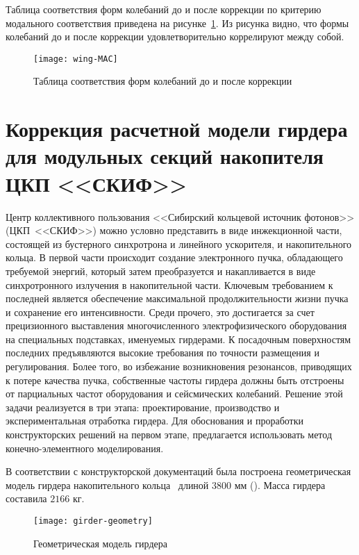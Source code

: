 Таблица соответствия форм колебаний до и после коррекции по критерию модального соответствия приведена на рисунке~\ref{fig:wing-MAC}. Из рисунка видно, что формы колебаний до и после коррекции удовлетворительно коррелируют между собой.

\begin{figure}[H]
	\centerfloat
	\texttt{[image: wing-MAC]}
	\caption{Таблица соответствия форм колебаний до и после коррекции} \label{fig:wing-MAC}
\end{figure}

\section{Коррекция расчетной модели гирдера для модульных секций накопителя ЦКП <<СКИФ>>}

Центр коллективного пользования <<Сибирский кольцевой источник фотонов>> (ЦКП~<<СКИФ>>) можно условно представить в виде инжекционной части, состоящей из бустерного синхротрона и линейного ускорителя, и накопительного кольца. В первой части происходит создание электронного пучка, обладающего требуемой энергий, который затем преобразуется и накапливается в виде синхротронного излучения в накопительной части. Ключевым требованием к последней является обеспечение максимальной продолжительности жизни пучка и сохранение его интенсивности. Среди прочего, это достигается за счет прецизионного выставления многочисленного электрофизического оборудования на специальных подставках, именуемых гирдерами. К посадочным поверхностям последних предъявляются высокие требования по точности размещения и регулирования. Более того, во избежание возникновения резонансов, приводящих к потере качества пучка, собственные частоты гирдера должны быть отстроены от парциальных частот оборудования и сейсмических колебаний. Решение этой задачи реализуется в три этапа: проектирование, производство и экспериментальная отработка гирдера. Для обоснования и проработки конструкторских решений на первом этапе, предлагается использовать метод конечно-элементного моделирования.

В соответствии с конструкторской документаций была построена геометрическая модель гирдера накопительного кольца~ длиной $ 3800 $ мм (). Масса гирдера составила $ 2166 $ кг. 

\begin{figure}[H]
	\centering
	\texttt{[image: girder-geometry]}
	\caption{Геометрическая модель гирдера} \label{fig:girder-geometry}
\end{figure}


